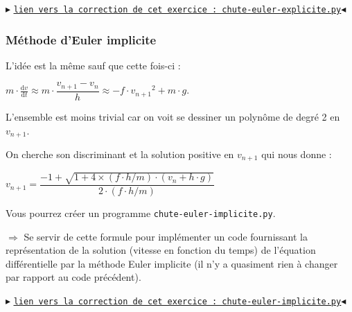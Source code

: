 \documentclass[11pt]{article}
\begin{document}
\begin{center}
$\blacktriangleright$ \href{https://github.com/formationPythonPC-Juin/corrections-formation/blob/master/chute-euler-explicite.py}{\underline{\texttt{lien vers la correction de cet exercice : chute-euler-explicite.py}}}$\blacktriangleleft$                                                                                                                                                                    \end{center}











\subsubsection{Méthode d'Euler implicite}

L'idée est la même sauf que cette fois-ci : 

 $m\cdot \frac{\text{d}{v}}{\text{d}t} \approx m\cdot \dfrac{v_{n+1} - v_n}{h} \approx -f\cdot {v_{n+1}}^2+m\cdot {g}$.

\smallskip
L'ensemble est moins trivial car on voit se dessiner un polynôme de degré 2 en $v_{n+1}$. 

\smallskip
On cherche son discriminant et la solution positive en $v_{n+1}$ qui nous donne : 

$v_{n+1} = \dfrac{-1+\sqrt{1+4\times (f\cdot h/m)\cdot (v_n +h\cdot g)}}{2\cdot (f\cdot h/m)}$
 
 
 
 

\smallskip

Vous pourrez créer un programme \texttt{chute-euler-implicite.py}.

\smallskip


 
 
 

 $\Longrightarrow$ Se servir de cette formule pour implémenter un code fournissant la représentation de la solution (vitesse en fonction du temps) de l'équation différentielle par la méthode Euler implicite (il n'y a quasiment rien à changer par rapport au code précédent).
 
 
 


\begin{center}
$\blacktriangleright$ \href{https://github.com/formationPythonPC-Juin/corrections-formation/blob/master/chute-euler-implicite.py}{\underline{\texttt{lien vers la correction de cet exercice : chute-euler-implicite.py}}}$\blacktriangleleft$                                                                                                                                                                    \end{center}
\end{document}
